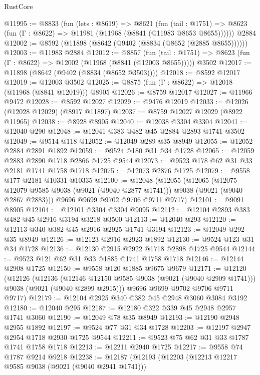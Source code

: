 \begin{lexlean}{RustCore}
\begin{coremodule}
@11995 := @8833
    (fun (lets : @8619) =>
    @8621
      (fun (tail : @1751) =>
      @8623 (fun (Γ : @8622) => @11981 (@11968 (@8841 (@11983 @8653 @8655))))))
    @2884
@12002 := @8592 (@11898 (@8642 (@9402 (@8834 (@8652 (@2885 @8655))))))
@12003 := @11983 @2884
@12012 := @8857
    (fun (tail : @1751) => @8623 (fun (Γ : @8622) => @12002 (@11968 (@8841 (@12003 @8655)))))
    @3502
@12017 := @11898 (@8642 (@9402 (@8834 (@8652 @3503))))
@12018 := @8592 @12017
@12019 := @12003 @3502
@12025 := @8875 (fun (Γ : @8622) => @12018 (@11968 (@8841 @12019))) @8905
@12026 := @8759 @12017
@12027 := @11966 @9472
@12028 := @8592 @12027
@12029 := @9476 @12019
@12033 := @12026 (@12028 @12029) (@8917 @11897)
@12037 := @8759 @12027 @12029 (@8922 @11965)
@12038 := @8928 @8905
@12040 := @12038 @3304 @3304
@12041 := @12040 @290
@12048 := @12041 @383 @482 @45 @2884 @2893 @1741 @3502
@12049 := @9514 @118
@12052 := @12049 @289 @35 @8949
@12055 := @12052 @2884 @2891 @1892
@12059 := @9524 @180 @31 @34 @1728
@12065 := @12059 @2883 @2890 @1718 @2866 @1725 @9544
@12073 := @9523 @178 @62 @31 @33 @2181 @1741 @1758 @1718
@12075 := @12073 @2876 @1725
@12079 := @9558 @177 @2181 @10331 @10335
@12100 := @12048
    (@12055
      (@12065
        (@12075 @12079 @9585 @9038 (@9021 (@9040 @2877 @1741)))
        @9038
        (@9021 (@9040 @2867 @2883)))
      @9696
      @9699
      @9702
      @9706
      @9711
      @9717)
@12101 := @9091 @8905
@12104 := @12101 @3304 @3304 @9095
@12112 := @12104 @2893 @383 @482 @45 @2916 @3194 @3218 @3500
@12113 := @12040 @293
@12120 := @12113 @340 @382 @45 @2916 @2925 @1741 @3194
@12123 := @12049 @292 @35 @8949
@12126 := @12123 @2916 @2923 @1892
@12130 := @9524 @123 @31 @34 @1728
@12136 := @12130 @2915 @2922 @1718 @2898 @1725 @9544
@12144 := @9523 @121 @62 @31 @33 @1885 @1741 @1758 @1718
@12146 := @12144 @2908 @1725
@12150 := @9558 @120 @1885 @9675 @9679
@12171 := @12120
    (@12126
      (@12136
        (@12146 @12150 @9585 @9038 (@9021 (@9040 @2909 @1741)))
        @9038
        (@9021 (@9040 @2899 @2915)))
      @9696
      @9699
      @9702
      @9706
      @9711
      @9717)
@12179 := @12104 @2925 @340 @382 @45 @2948 @3060 @3084 @3192
@12180 := @12040 @295
@12187 := @12180 @322 @339 @45 @2948 @2957 @1741 @3060
@12190 := @12049 @78 @35 @8949
@12193 := @12190 @2948 @2955 @1892
@12197 := @9524 @77 @31 @34 @1728
@12203 := @12197 @2947 @2954 @1718 @2930 @1725 @9544
@12211 := @9523 @75 @62 @31 @33 @1787 @1741 @1758 @1718
@12213 := @12211 @2940 @1725
@12217 := @9558 @74 @1787 @9214 @9218
@12238 := @12187
    (@12193
      (@12203
        (@12213 @12217 @9585 @9038 (@9021 (@9040 @2941 @1741)))

\end{coremodule}
\end{lexlean}
